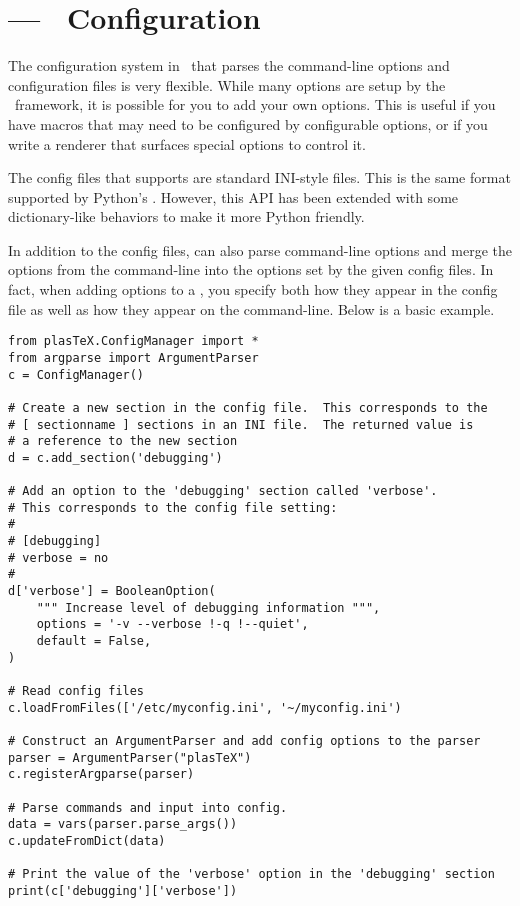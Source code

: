 
\section{ --- \plasTeX\ Configuration}
\label{sec:configuration-api}


The configuration system in \plasTeX\ that parses the command-line options
and configuration files is very flexible.  While many options are setup
by the \plasTeX\ framework, it is possible for you to add your own options.
This is useful if you have macros that may need to be configured by 
configurable options, or if you write a renderer that surfaces special options
to control it.

The config files that  supports are standard INI-style
files.  This is the same format supported by Python's .
However, this API has been extended with some dictionary-like behaviors
to make it more Python friendly.

In addition to the config files,  can also parse
command-line options and merge the options from the command-line into
the options set by the given config files.  In fact, when adding options
to a , you specify both how they appear in the config
file as well as how they appear on the command-line.  Below is a basic 
example.

\begin{verbatim}
from plasTeX.ConfigManager import *
from argparse import ArgumentParser
c = ConfigManager()

# Create a new section in the config file.  This corresponds to the
# [ sectionname ] sections in an INI file.  The returned value is 
# a reference to the new section
d = c.add_section('debugging')

# Add an option to the 'debugging' section called 'verbose'.
# This corresponds to the config file setting:
#
# [debugging]
# verbose = no
#
d['verbose'] = BooleanOption(
    """ Increase level of debugging information """,
    options = '-v --verbose !-q !--quiet',
    default = False,
)

# Read config files
c.loadFromFiles(['/etc/myconfig.ini', '~/myconfig.ini')

# Construct an ArgumentParser and add config options to the parser
parser = ArgumentParser("plasTeX")
c.registerArgparse(parser)

# Parse commands and input into config.
data = vars(parser.parse_args())
c.updateFromDict(data)

# Print the value of the 'verbose' option in the 'debugging' section
print(c['debugging']['verbose'])
\end{verbatim}

